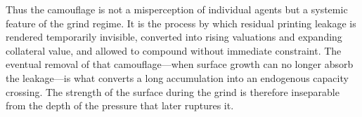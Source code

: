 Thus the camouflage is not a misperception of individual agents but a systemic feature of the grind regime. It is the process by which residual printing leakage is rendered temporarily invisible, converted into rising valuations and expanding collateral value, and allowed to compound without immediate constraint. The eventual removal of that camouflage—when surface growth can no longer absorb the leakage—is what converts a long accumulation into an endogenous capacity crossing. The strength of the surface during the grind is therefore inseparable from the depth of the pressure that later ruptures it.
